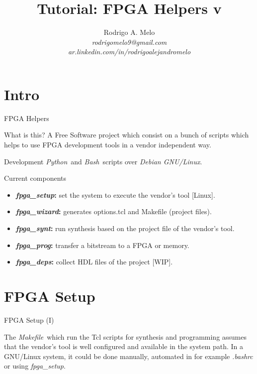 \documentclass{beamer}
\title[FPGA Helpers]{Tutorial: FPGA Helpers v\version}
\author{
  Rodrigo A. Melo\\
  \textit{rodrigomelo9@gmail.com}\\
  \textit{ar.linkedin.com/in/rodrigoalejandromelo}
}
\newcommand{\python}         {\textit{Python}}
\newcommand{\bash}           {\textit{Bash}}
\newcommand{\debian}         {\textit{Debian GNU/Linux}}
\newcommand{\fpgasetup}      {\textit{fpga\_setup}}
\newcommand{\fpgawizard}     {\textit{fpga\_wizard}}
\newcommand{\fpgasynt}       {\textit{fpga\_synt}}
\newcommand{\fpgaprog}       {\textit{fpga\_prog}}
\newcommand{\fpgadeps}       {\textit{fpga\_deps}}
\newcommand{\makefile}       {\textit{Makefile}}
\begin{document}
\begin{frame}
  \titlepage
\end{frame}

\section{Intro}

\begin{frame}{FPGA Helpers}
  \begin{exampleblock}{What is this?}
    A Free Software project which consist on a bunch of scripts which helps to use FPGA development
    tools in a vendor independent way.
  \end{exampleblock}
  \begin{block}{Development}
    \python\ and \bash\ scripts over \debian.
  \end{block}
\end{frame}

\begin{frame}{Current components}
  \begin{itemize}
    \item \textbf{\fpgasetup:} set the system to execute the vendor's tool [Linux].
    \item \textbf{\fpgawizard:} generates options.tcl and Makefile (project files).
    \item \textbf{\fpgasynt:} run synthesis based on the project file of the vendor's tool.
    \item \textbf{\fpgaprog:} transfer a bitstream to a FPGA or memory.
    \item \textbf{\fpgadeps:} collect HDL files of the project [WIP].
  \end{itemize}
\end{frame}


\section{FPGA Setup}

\begin{frame}[fragile]{FPGA Setup (I)}
  \begin{block}{}
    The \makefile\ which run the Tcl scripts for synthesis and programming assumes that the
    vendor's tool is well configured and available in the system path.
    In a GNU/Linux system, it could be done manually, automated in for example \textit{.bashrc} or
    using \fpgasetup.
  \end{block}{}
  \scriptsize
  
\end{frame}
\end{document}
